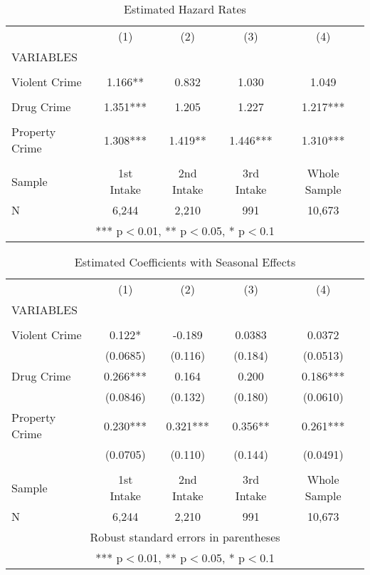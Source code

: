 \documentclass{article}
\begin{document}
\vspace{.25in}

\begin{table}[t]
    \centering
    \caption{Estimated Hazard Rates}
\begin{tabular}{lcccc} \hline
 & (1) & (2) & (3) & (4) \\
VARIABLES &  &  &  &  \\ \hline
 &  &  &  &  \\
Violent Crime & 1.166** & 0.832 & 1.030 & 1.049 \\
 &  &  &  &  \\
Drug Crime & 1.351*** & 1.205 & 1.227 & 1.217*** \\
 &  &  & &  \\
Property Crime & 1.308*** & 1.419** & 1.446*** & 1.310*** \\
 &  &  &  &  \\
 Sample & 1st Intake & 2nd Intake & 3rd Intake & Whole Sample \\
 N & 6,244 & 2,210 & 991 & 10,673 \\ \hline
\multicolumn{5}{c}{ *** p$<$0.01, ** p$<$0.05, * p$<$0.1} \\
\end{tabular}
    \label{tab4}
\end{table}

\vspace{.25in}
 
\begin{table}[h!]
    \centering
\begin{tabular}{lcccc} \hline
 & (1) & (2) & (3) & (4) \\
VARIABLES &  &  &  &  \\ \hline
 &  &  &  &  \\
Violent Crime & 0.122* & -0.189 & 0.0383 & 0.0372 \\
 & (0.0685) & (0.116) & (0.184) & (0.0513) \\
Drug Crime & 0.266*** & 0.164 & 0.200 & 0.186*** \\
 & (0.0846) & (0.132) & (0.180) & (0.0610) \\
Property Crime & 0.230*** & 0.321*** & 0.356** & 0.261*** \\
 & (0.0705) & (0.110) & (0.144) & (0.0491) \\
 &  &  &  &  \\
 Sample & 1st Intake & 2nd Intake & 3rd Intake & Whole Sample \\
 N & 6,244 & 2,210 & 991 & 10,673 \\ \hline
\multicolumn{5}{c}{ Robust standard errors in parentheses} \\
\multicolumn{5}{c}{ *** p$<$0.01, ** p$<$0.05, * p$<$0.1} \\
\end{tabular}
    \caption{Estimated Coefficients with Seasonal Effects}
    \label{tab5}
\end{table}
\end{document}

